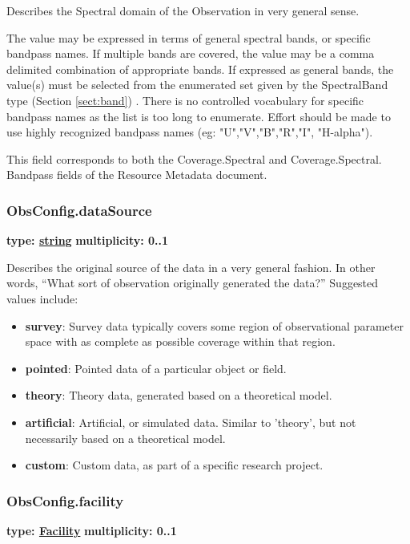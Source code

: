   Describes the Spectral domain of the Observation in very general sense.

  The value may be expressed in terms of general spectral bands, or specific
  bandpass names. If multiple bands are covered, the value may be a comma
  delimited combination of appropriate bands. If expressed as general bands, the
  value(s) must be selected from the enumerated set given by the SpectralBand
  type (Section \ref{sect:band}) . There is no controlled vocabulary for specific
  bandpass names as the list is too long to enumerate. Effort should be made
  to use highly recognized bandpass names (eg: "U","V","B","R","I", "H-alpha").
  
  This field corresponds to both the Coverage.Spectral and Coverage.Spectral.
  Bandpass fields of the Resource Metadata document.
  
  \subsubsection{ObsConfig.dataSource}
  \textbf{type: \hyperref[sect:ivoa]{string}} \newline
  \textbf{multiplicity: 0..1} \newline

  Describes the original source of the data in a very general fashion. In
  other words, ``What sort of observation originally generated the data?''
  Suggested values include:
  \begin{itemize}
  \item \textbf{survey}: Survey data typically covers some region of observational parameter space with as complete as possible coverage within that region.
  \item \textbf{pointed}: Pointed data of a particular object or field.
  \item \textbf{theory}: Theory data, generated based on a theoretical model.
  \item \textbf{artificial}: Artificial, or simulated data. Similar to 'theory', but not necessarily based on a theoretical model.
  \item \textbf{custom}: Custom data, as part of a specific research project.
  \end{itemize}

  \subsubsection{ObsConfig.facility}
  \textbf{type: \hyperref[sect:facility]{Facility}} \newline
  \textbf{multiplicity: 0..1} \newline

